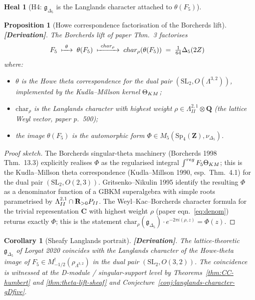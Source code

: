 \documentclass[11pt]{amsart}
\newtheorem{proposition}[theorem]{Proposition}
\newtheorem{corollary}[theorem]{Corollary}
\theoremstyle{definition}
\newtheorem{heal}[attack]{Heal}
\providecommand{\Sp}{\mathrm{Sp}}
\providecommand{\SL}{\mathrm{SL}}
\providecommand{\bC}{\mathbf{C}}
\providecommand{\bZ}{\mathbf{Z}}
\providecommand{\bR}{\mathbf{R}}
\providecommand{\bQ}{\mathbf{Q}}
\providecommand{\Dfive}{\Delta_5}
\providecommand{\gDfive}{\mathfrak{g}_{\Dfive}}
\providecommand{\ClaimStatusDerivation}{\textbf{[Derivation]}}
\begin{document}
\begin{heal}[H4: $\gDfive$ is the Langlands character attached to
$\theta(F_5)$]\leavevmode

\begin{proposition}[Howe correspondence factorisation of the Borcherds
lift]\label{prop:howe-factorisation}
\ClaimStatusDerivation.
The Borcherds lift of paper Thm.~3 factorises
\[
 F_5 \;\xmapsto{\ \theta\ }\; \theta(F_5)
 \;\xmapsto{\ \mathrm{char}_\rho\ }\; \mathrm{char}_\rho(\theta(F_5))
 \;=\; \tfrac{1}{64}\Dfive(2Z)
\]
where:
\begin{itemize}
 \item $\theta$ is the Howe theta correspondence for the dual pair
   $(\SL_2, O(\Lambda^{3,2}))$, implemented by the Kudla--Millson
   kernel $\Theta_{\rm KM}$;
 \item $\mathrm{char}_\rho$ is the Langlands character with highest
   weight $\rho \in \Lambda^{2,1}_{II} \otimes \bQ$ (the lattice
   Weyl vector, paper p.~500);
 \item the image $\theta(F_5)$ is the automorphic form
   $\Phi \in M_5(\Sp_4(\bZ), \nu_{\Dfive})$.
\end{itemize}
\end{proposition}

\begin{proof}[Proof sketch]
The Borcherds singular-theta machinery (Borcherds 1998 Thm.~13.3)
explicitly realises $\Phi$ as the regularised integral
$\int^{\rm reg} F_5 \Theta_{\rm KM}$; this is the Kudla--Millson theta
correspondence (Kudla--Millson 1990, esp.\ Thm.~4.1) for the dual
pair $(\SL_2, O(2,3))$. Gritsenko--Nikulin 1995 identify the resulting
$\Phi$ as a denominator function of a GBKM superalgebra with simple
roots parametrised by $\Lambda^{2,1}_{II} \cap \bR_{>0}\cP_{II}$. The
Weyl--Kac--Borcherds character formula for the trivial representation
$\bC$ with highest weight $\rho$ (paper eqn.\ \eqref{eq:denom})
returns exactly $\Phi$; this is the statement
$\mathrm{char}_\rho(\gDfive) \cdot e^{-2\pi i(\rho, z)} = \Phi(z)$.
\end{proof}

\begin{corollary}[Sheafy Langlands portrait]
\label{cor:sheafy-portrait-gDfive}
\ClaimStatusDerivation.
The lattice-theoretic $\gDfive$ of Lorgat 2020 coincides with the
Langlands character of the Howe-theta image of
$F_5 \in M^!_{-1/2}(\rho_{\Lambda^{3,2}})$ in the dual pair
$(\SL_2, O(3,2))$. The coincidence is witnessed at the
D-module / singular-support level by
Theorems~\ref{thm:CC-humbert} and \ref{thm:theta-lift-sheaf} and
Conjecture~\ref{conj:langlands-character-gDfive}.
\end{corollary}


\end{heal}
\end{document}
